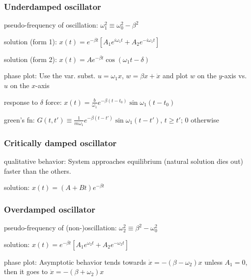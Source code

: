 \documentclass[letterpaper,landscape,10pt]{article}
\newenvironment{mydescription}
{\begin{description}
	\setlength{\itemsep}{0pt}
	\setlength{\parskip}{0pt}
	\setlength{\parsep}{-1pt}}
{\end{description}}
\begin{document}
{\begin{multicols}{4}
    \subsubsection*{Underdamped oscillator}
    	\begin{mydescription}
    		\item[pseudo-frequency of oscillation:]
    			$\omega_1^2 \equiv \omega_0^2 - \beta^2$  \\
    		\item[solution (form 1):]
    			$x(t) = e^{-\beta t}\left[ A_1e^{i\omega_1t} +
    			A_2e^{-i\omega_1t} \right]$  \\
    		\item[solution (form 2):]
    			$x(t) = Ae^{-\beta t}\cos(\omega_1t-\delta)$  \\
    		\item[phase plot:]
    			Use the var. subst. $u=\omega_1 x$, $w=\beta x+\dot{x}$ and
    			plot $w$ on the $y$-axis vs. $u$ on the $x$-axis \\
    		\item[response to $\delta$ force:]
    			$x(t) = \frac{b}{\omega_1}e^{-\beta
    			(t-t_0)}\sin\omega_1(t-t_0)$  \\
    		\item[green's fn:]
    			$G(t,t') \equiv \frac{1}{m\omega_1}e^{-\beta
    			(t-t')}\sin\omega_1(t-t')$, $t\geq t'$; $0$ otherwise  \\
    	\end{mydescription}
    
    \subsubsection*{Critically damped oscillator}
    	\begin{mydescription}
    		\item[qualitative behavior:]
    			System approaches equilibrium (natural solution dies out)
    			faster than the others.\\
    		\item[solution:]
    			$x(t) = (A+Bt)e^{-\beta t}$  \\
    	\end{mydescription}
    
    \subsubsection*{Overdamped oscillator}
    	\begin{mydescription}
    		\item[pseudo-frequency of (non-)oscillation:]
    			$\omega_2^2 \equiv \beta^2 - \omega_0^2$  \\
    		\item[solution:]
    			$x(t) = e^{-\beta t}\left[ A_1e^{\omega_2t} + A_2e^{-\omega_2t}
    			\right]$  \\
    		\item[phase plot:]
    			Asymptotic behavior tends towards $\dot{x}=-(\beta-\omega_2)x$
    			unless $A_1=0$, then it goes to $\dot{x}=-(\beta+\omega_2)x$
    	\end{mydescription}
    

\end{multicols}}
\end{document}

